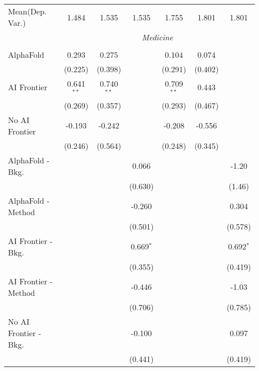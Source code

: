 \begin{tabular}{lcccccc}
Mean(Dep. Var.) & 1.484 & 1.535 & 1.535 & 1.755 & 1.801 & 1.801 \\
 & \multicolumn{6}{c}{\textit{Medicine}} \\ \\
   AlphaFold               & 0.293        & 0.275        &             & 0.104        & 0.074   &   \\   
                           & (0.225)      & (0.398)      &             & (0.291)      & (0.402) &   \\   
   AI Frontier             & 0.641$^{**}$ & 0.740$^{**}$ &             & 0.709$^{**}$ & 0.443   &   \\   
                           & (0.269)      & (0.357)      &             & (0.293)      & (0.467) &   \\   
   No AI Frontier          & -0.193       & -0.242       &             & -0.208       & -0.556  &   \\   
                           & (0.246)      & (0.564)      &             & (0.248)      & (0.345) &   \\   
   AlphaFold - Bkg.        &              &              & 0.066       &              &         & -1.20\\   
                           &              &              & (0.630)     &              &         & (1.46)\\   
   AlphaFold - Method      &              &              & -0.260      &              &         & 0.304\\   
                           &              &              & (0.501)     &              &         & (0.578)\\   
   AI Frontier - Bkg.      &              &              & 0.669$^{*}$ &              &         & 0.692$^{*}$\\   
                           &              &              & (0.355)     &              &         & (0.419)\\   
   AI Frontier - Method    &              &              & -0.446      &              &         & -1.03\\   
                           &              &              & (0.706)     &              &         & (0.785)\\   
   No AI Frontier - Bkg.   &              &              & -0.100      &              &         & 0.097\\   
                           &              &              & (0.441)     &              &         & (0.419)\\   

\end{tabular}
